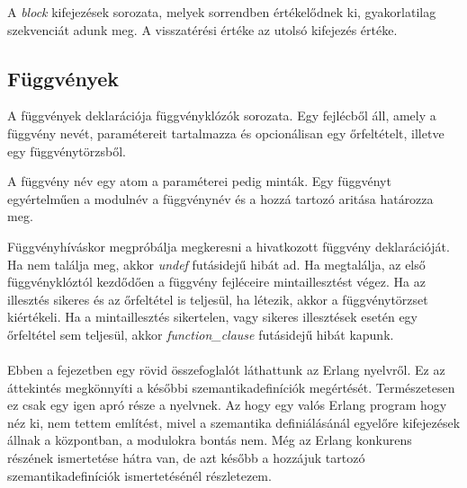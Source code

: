 

A \textit{block} kifejezések sorozata, melyek sorrendben értékelődnek ki, gyakorlatilag szekvenciát adunk meg. A visszatérési értéke az utolsó kifejezés értéke.

\subsection{Függvények}

A függvények deklarációja függvényklózók sorozata. Egy fejlécből áll, amely a függvény nevét, paramétereit tartalmazza és opcionálisan egy őrfeltételt, illetve egy függvénytörzsből.



A függvény név egy atom a paraméterei pedig minták. Egy függvényt egyértelműen a modulnév a függvénynév és a hozzá tartozó aritása határozza meg.

Függvényhíváskor megpróbálja megkeresni a hivatkozott függvény deklarációját. Ha nem találja meg, akkor \textit{undef} futásidejű hibát ad. Ha megtalálja, az első függvényklóztól kezdődően a függvény fejléceire mintaillesztést végez. Ha az illesztés sikeres és az őrfeltétel is teljesül, ha létezik, akkor a függvénytörzset kiértékeli. Ha a mintaillesztés sikertelen, vagy sikeres illesztések esetén egy őrfeltétel sem teljesül, akkor \textit{function\_clause} futásidejű hibát kapunk.

\paragraph{}
Ebben a fejezetben egy rövid összefoglalót láthattunk az Erlang nyelvről. Ez az áttekintés megkönnyíti a későbbi szemantikadefiníciók megértését. Természetesen ez csak egy igen apró része a nyelvnek. Az hogy egy valós Erlang program hogy néz ki, nem tettem említést, mivel a szemantika definiálásánál egyelőre kifejezések állnak a központban, a modulokra bontás nem. Még az Erlang konkurens részének ismertetése hátra van, de azt később a hozzájuk tartozó szemantikadefiníciók ismertetésénél részletezem.